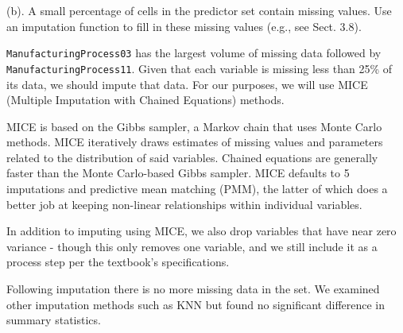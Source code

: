 \documentclass[]{report}
\begin{document}
\begin{subquestion}{(b).} A small percentage of cells in the predictor set contain missing values. Use an imputation function to fill in these missing values (e.g., see Sect. 3.8). 
\end{subquestion}

\texttt{ManufacturingProcess03} has the largest volume of missing data
followed by \texttt{ManufacturingProcess11}. Given that each variable is
missing less than 25\% of its data, we should impute that data. For our
purposes, we will use MICE (Multiple Imputation with Chained Equations)
methods.

MICE is based on the Gibbs sampler, a Markov chain that uses Monte Carlo
methods. MICE iteratively draws estimates of missing values and
parameters related to the distribution of said variables. Chained
equations are generally faster than the Monte Carlo-based Gibbs sampler.
MICE defaults to 5 imputations and predictive mean matching (PMM), the
latter of which does a better job at keeping non-linear relationships
within individual variables.

In addition to imputing using MICE, we also drop variables that have
near zero variance - though this only removes one variable, and we still
include it as a process step per the textbook's specifications.

Following imputation there is no more missing data in the set. We
examined other imputation methods such as KNN but found no significant
difference in summary statistics.
\end{document}
